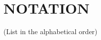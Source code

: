 \section*{\centering NOTATION}
\begin{center}
    (List in the alphabetical order)
\end{center}{} 
\printglossary[title=Nomenclature]
\newpage

